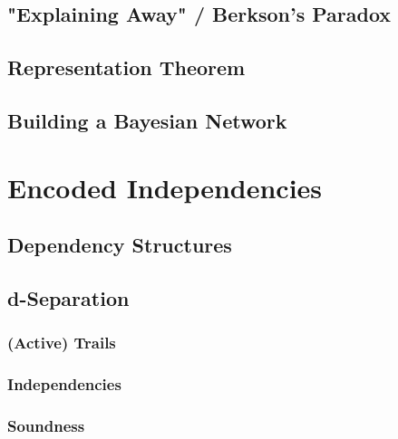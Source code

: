         \subsection{"Explaining Away" / Berkson's Paradox} %

        \subsection{Representation Theorem} %

        \subsection{Building a Bayesian Network} %

    \section{Encoded Independencies} %

        \subsection{Dependency Structures} %

        \subsection{d-Separation} %

            \subsubsection{(Active) Trails} %

            \subsubsection{Independencies} %

            \subsubsection{Soundness} %

